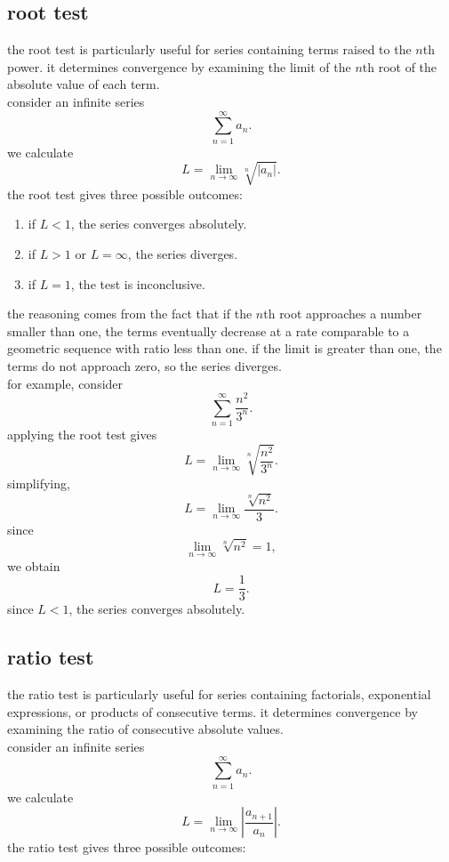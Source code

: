 \documentclass{article}
\begin{document}
\newpage

\subsection{root test}

the root test is particularly useful for series containing terms raised to the $n$th power. it determines convergence by examining the limit of the $n$th root of the absolute value of each term.\\

consider an infinite series
\[
\sum_{n=1}^{\infty}a_n.
\]
we calculate
\[
L=\lim_{n\to\infty}\sqrt[n]{|a_n|}.
\]
the root test gives three possible outcomes:

\begin{enumerate}
    \item if $L<1$, the series converges absolutely.
    \item if $L>1$ or $L=\infty$, the series diverges.
    \item if $L=1$, the test is inconclusive.
\end{enumerate}

the reasoning comes from the fact that if the $n$th root approaches a number smaller than one, the terms eventually decrease at a rate comparable to a geometric sequence with ratio less than one. if the limit is greater than one, the terms do not approach zero, so the series diverges.\\

for example, consider
\[
\sum_{n=1}^{\infty}\frac{n^2}{3^n}.
\]
applying the root test gives
\[
L=
\lim_{n\to\infty}
\sqrt[n]{\frac{n^2}{3^n}}.
\]
simplifying,
\[
L=
\lim_{n\to\infty}
\frac{\sqrt[n]{n^2}}{3}.
\]
since
\[
\lim_{n\to\infty}\sqrt[n]{n^2}=1,
\]
we obtain
\[
L=\frac{1}{3}.
\]
since $L<1$, the series converges absolutely.\\

\subsection{ratio test}

the ratio test is particularly useful for series containing factorials, exponential expressions, or products of consecutive terms. it determines convergence by examining the ratio of consecutive absolute values.\\

consider an infinite series
\[
\sum_{n=1}^{\infty}a_n.
\]
we calculate
\[
L=\lim_{n\to\infty}
\left|\frac{a_{n+1}}{a_n}\right|.
\]
the ratio test gives three possible outcomes:
\end{document}
